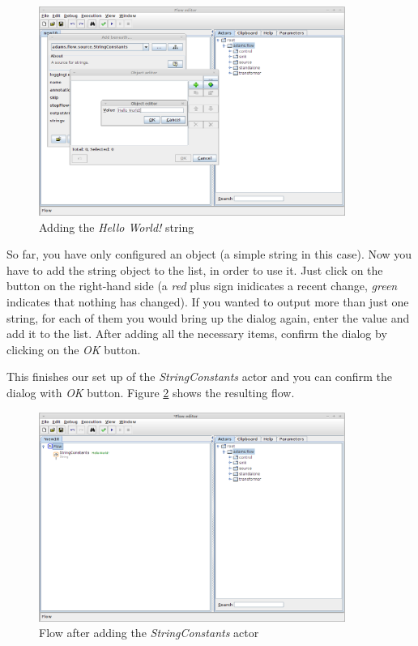 \begin{figure}[htb]
  \centering
  \includegraphics[width=10.0cm]{images/floweditor-helloworld-addactor4.png}
  \caption{Adding the \textit{Hello World!} string}
  \label{floweditor-helloworld-addactor4}
\end{figure}

So far, you have only configured an object (a simple string in this case). Now
you have to add the string object to the list, in order to use it. Just click on
the  button on the right-hand side (a
\textit{red} plus sign inidicates a recent change, \textit{green} indicates
that nothing has changed). If you wanted to output more than just one string,
for each of them you would bring up the dialog again, enter the value and add
it to the list. After adding all the necessary items, confirm the dialog by
clicking on the \textit{OK} button.

This finishes our set up of the \textit{StringConstants} actor and you can
confirm the dialog with \textit{OK} button. Figure
\ref{floweditor-helloworld-addactor5} shows the resulting flow.

\begin{figure}[htb]
  \centering
  \includegraphics[width=10.0cm]{images/floweditor-helloworld-addactor5.png}
  \caption{Flow after adding the \textit{StringConstants} actor}
  \label{floweditor-helloworld-addactor5}
\end{figure}

